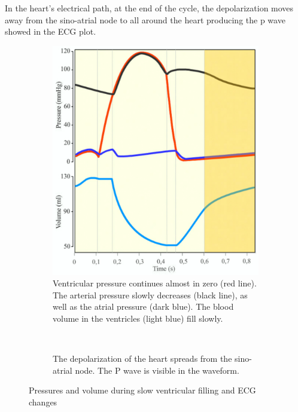 In the heart's electrical path, at the end of the cycle, the depolarization moves away from the sino-atrial node to all around the heart producing the p wave showed in the ECG plot.  

\begin{figure}[!htpb]
	 \begin{subfigure}[t]{0.48\textwidth}
	 	\centering
	 	\includegraphics[width=\textwidth,keepaspectratio]{figure_15}
	 	\caption{Ventricular pressure continues almost in zero (red line). The arterial pressure slowly decreases (black line), as well as the atrial pressure (dark blue). The blood volume in the ventricles (light blue) fill slowly.}
	 	\label{fig:heart slow ventricular filling}
	 \end{subfigure}
	 ~
	 \begin{subfigure}[t]{0.48\textwidth}
	 	\centering
	 	\caption{The depolarization of the heart spreads from the sino-atrial node. The P wave is visible in the waveform. }
	 	\label{fig:pressure slow ventricular fillig}
	 \end{subfigure}
	 \caption[Slow ventricular filling]{Pressures and volume during slow ventricular filling and ECG changes}
\end{figure}
 

